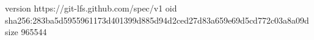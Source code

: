 version https://git-lfs.github.com/spec/v1
oid sha256:283ba5d5955961173d401399d885d94d2ced27d83a659e69d5cd772c03a8a09d
size 965544
